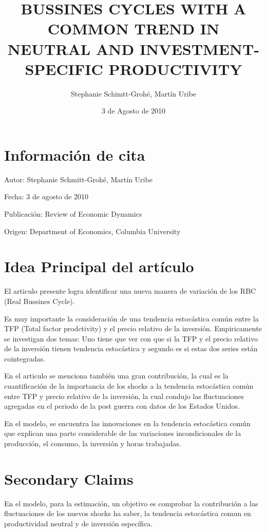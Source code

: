 \documentclass{article}
\title{BUSSINES CYCLES WITH A COMMON TREND IN NEUTRAL AND INVESTMENT-SPECIFIC PRODUCTIVITY}
\author{Stephanie Schimtt-Grohé, Martín Uribe}
\date{3 de Agosto de 2010}
\begin{document}
\maketitle

\section{Información de cita}

Autor: Stephanie Schmitt-Grohé, Martín Uribe

Fecha: 3 de agosto de 2010

Publicación: Review of Economic Dynamics

Origen:  Department of Economics, Columbia University

\section{Idea Principal del artículo}

El articulo presente logra identificar una nueva manera de variación de los RBC (Real Bussines Cycle). 

Es muy importante la consideración de una tendencia estocástica común  entre la TFP (Total factor prodctivity) y el precio relativo de la inversión. Empiricamente se investigan dos temas: Uno tiene que ver con que si la TFP y el precio relativo de la inversión tienen tendencia estocástica y segundo es si estas dos series están cointegradas.

En el articulo se menciona también una gran contribución, la cual es la cuantificación de la importancia de los shocks a la tendencia estocástica común entre TFP y precio relativo de la inversión, la cual condujo las fluctuaciones agregadas en el periodo de la post guerra con datos de los Estados Unidos. 

En el modelo, se encuentra las innovaciones en la tendencia estocástica común que explican una parte considerable de las variaciones incondicionales de la producción, el consumo, la inversión y horas trabajadas.
 
\section{Secondary Claims}

En el modelo, para la estimación, un objetivo es comprobar la contribución a las fluctuaciones de los nuevos shocks ha saber, la tendencia estocástica comun en productividad neutral y de inversión específica.
\end{document}
